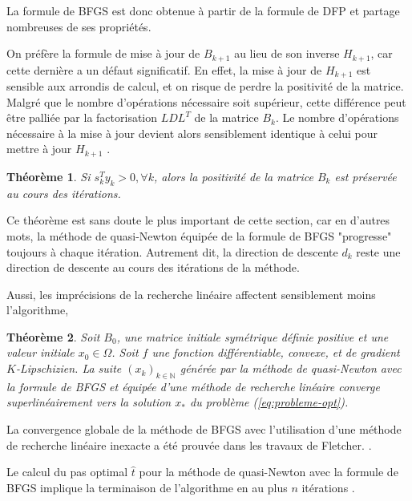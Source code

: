 \documentclass[3p, twocolumn]{elsarticle}
\newtheorem{thm}{Théorème}
\begin{document}
La formule de BFGS est donc obtenue à partir de la formule de DFP et partage nombreuses de ses propriétés.
\begin{rmk}
    On préfère la formule de mise à jour de $B_{k+1}$ au lieu de son inverse $H_{k+1}$, car cette dernière a un défaut significatif. En effet, la mise à jour de $H_{k+1}$ est sensible aux arrondis de calcul, et on risque de perdre la positivité de la matrice. Malgré que le nombre d'opérations nécessaire soit supérieur, cette différence peut être palliée par la factorisation $LDL^T$ de la matrice $B_{k}$. Le nombre d'opérations nécessaire à la mise à jour devient alors sensiblement identique à celui pour mettre à jour $H_{k+1}$ \cite{book:GillMurrayWright1981}.
\end{rmk}

\begin{thm}
    Si $s_k^Ty_k > 0, \forall k$, alors la positivité de la matrice $B_{k}$ est préservée au cours des itérations.
\end{thm}

Ce théorème est sans doute le plus important de cette section, car en d'autres mots, la méthode de quasi-Newton équipée de la formule de BFGS "progresse" toujours à chaque itération. Autrement dit, la direction de descente $d_k$ reste une direction de descente au cours des itérations de la méthode.

Aussi, les imprécisions de la recherche linéaire affectent sensiblement moins l'algorithme,

\begin{thm}
    Soit $B_0$, une matrice initiale symétrique définie positive et une valeur initiale $x_0\in\Omega$. Soit $f$ une fonction différentiable, convexe, et de gradient $K$-Lipschizien. La suite $(x_k)_{k\in \mathbb{N}}$ générée par la méthode de quasi-Newton avec la formule de BFGS et équipée d'une méthode de recherche linéaire converge superlinéairement vers la solution $x_*$ du problème (\ref{eq:probleme-opt}).
\end{thm}
\begin{pf}
    La convergence globale de la méthode de BFGS avec l'utilisation d'une méthode de recherche linéaire inexacte a été prouvée dans les travaux de Fletcher. \cite{book:Fletcher_1987}.
\end{pf}

\begin{rmk}
    Le calcul du pas optimal $\hat t$ pour la méthode de quasi-Newton avec la formule de BFGS implique la terminaison de l'algorithme en au plus $n$ itérations \cite{book:Fletcher_1987}.
\end{rmk}
\end{document}
